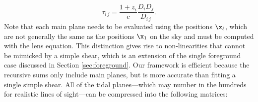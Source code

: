 \begin{equation}
\tau_{i\,j} = \frac{ 1 + z_i}{c} \frac{D_i D_j}{D_{i\,j}}.
\end{equation}
Note that each main plane needs to be evaluated using the positions $\x_\ell$, which are not generally the same as the positions $\x_1$ on the sky and must be computed with the lens equation. This distinction gives rise to non-linearities that cannot be mimicked by a simple shear, which is an extension of the single foreground case discussed in Section \ref{sec:foreground}. Our framework is efficient because the recursive sums only include main planes, but is more accurate than fitting a single simple shear. All of the tidal planes---which may number in the hundreds for realistic lines of sight---can be compressed into the following matrices:
